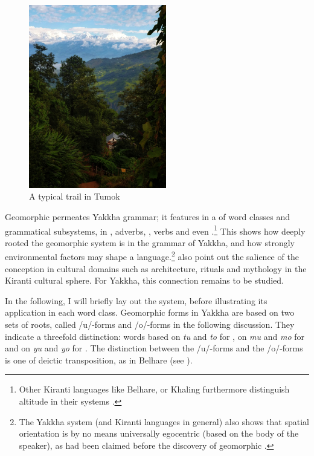 \begin{figure}
\centering
\includegraphics[width=6cm]{figures/tumok-path.jpg}
\caption{A typical trail in Tumok}\label{tumok-path}
\end{figure}

Geomorphic  permeates Yakkha grammar;  it features in a  of word classes and grammatical subsystems, in , adverbs, ,  verbs and even .\footnote{Other Kiranti languages like Belhare,  or Khaling furthermore distinguish altitude in their   systems \citep{Ebert1994The-structure, Bickel1997Spatial}.} This shows how deeply rooted the geomorphic system is in the grammar of Yakkha, and how strongly environmental factors may shape a language.\footnote{The Yakkha system (and Kiranti languages in general) also shows that spatial orientation is by no means universally egocentric (based on the body of the speaker), as had been claimed before the discovery of geomorphic .} \citet{Bickeletal1999Cultural} also point out the salience of the  conception in cultural domains such as architecture, rituals and mythology in the Kiranti cultural sphere. For Yakkha, this connection remains to be studied.

In the following, I will briefly lay out the system, before illustrating its application in each word class. Geomorphic forms in Yakkha are based on two sets of roots, called /u/-forms and /o/-forms in the following discussion. They indicate  a threefold distinction: words based on \emph{tu} and \emph{to} for , on \emph{mu} and \emph{mo} for  and on \emph{yu} and \emph{yo} for . The distinction between the /u/-forms and the /o/-forms is one of deictic transposition, as in Belhare (see \citealt{Bickel1997Spatial, Bickel2001Deictic}). 

